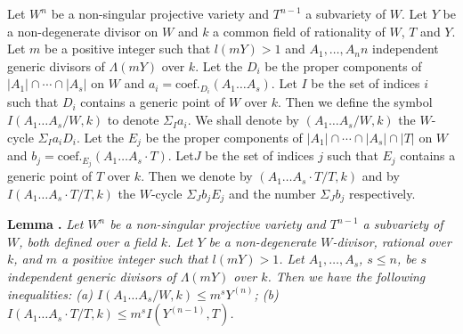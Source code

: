 Let $W^{n}$ be a non-singular projective variety and $T^{n-1}$ a subvariety of $W$. Let $Y$ be a non-degenerate divisor on $W$ and $k$ a common field of rationality of $W$, $T$ and $Y$. Let $m$ be a positive integer such that $l(mY)>1$ and $A_{1},\ldots,A_{n} n$ independent generic divisors of $\Lambda(mY)$ over $k$. Let the $D_{i}$ be the proper components of $|A_{1}|\cap \cdots \cap |A_{s}|$ on $W$ and $a_{i}=\text{coef.}_{D_{i}}(A_{1}\ldots A_{s})$. Let $I$ be the set of indices $i$ such that $D_{i}$ contains a generic point of $W$ over $k$. Then we define the symbol $I(A_{1}\ldots A_{s}/W,k)$ to denote $\Sigma_{I}a_{i}$. We shall denote by $(A_{1}\ldots A_{s}/W,k)$ the $W$-cycle $\Sigma_{I}a_{i}D_{i}$. Let the $E_{j}$ be the proper components of $|A_{1}|\cap \cdots \cap | A_{s}|\cap |T|$ on $W$ and $b_{j}=\text{coef.}_{E_{j}}(A_{1}\ldots A_{s}\cdot T)$. Let\pageoriginale $J$ be the set of indices $j$ such that $E_{j}$ contains a generic point of $T$ over $k$. Then we denote by $(A_{1}\ldots A_{s}\cdot T/T,k)$ and by $I(A_{1}\ldots A_{s}\cdot T/T,k)$ the $W$-cycle $\Sigma_{J}b_{j}E_{j}$ and the number $\Sigma_{J}b_{j}$ respectively.

\medskip
\noindent
{\bf Lemma .\label{art14-lem5}}
{\em Let $W^{n}$ be a non-singular projective variety and $T^{n-1}$ a subvariety of $W$, both defined over a field $k$. Let $Y$ be a non-degenerate $W$-divisor, rational over $k$, and $m$ a positive integer such that $l(mY)>1$. Let $A_{1},\ldots,A_{s}$, $s\leq n$, be $s$ independent generic divisors of $\Lambda (mY)$ over $k$. Then we have the following inequalities: {\rm(a)} $I(A_{1}\ldots A_{s}/W,k)\leq m^{s}Y^{(n)}$; {\rm(b)} $I(A_{1}\ldots A_{s}\cdot T/T,k)\leq m^{s}I(Y^{(n-1)},T)$.}

